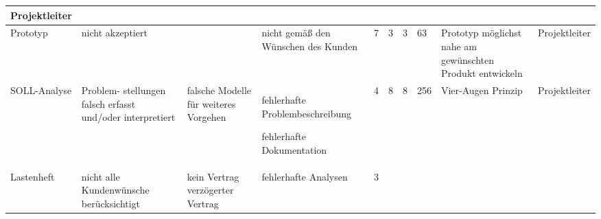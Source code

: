 \begin{center}
{\begin{tabular}{|p{1.5cm}|p{1.5cm}|p{1.7cm}|p{1.5cm}|p{0.25cm}|p{0.25cm}|p{0.25cm}|p{0.5cm}|p{1.5cm}|p{1.5cm}|}
{
	Projektleiter
}\\ \hline
%
%
{
	Prototyp
}&

{
	nicht akzeptiert
}&

{
	
}&

{
	nicht gem\"{a}\ss{} den W\"{u}nschen des Kunden
}&

{
	7
}&

{
	3
}&

{
	3
}&

{
	63
}&

{
	Prototyp m\"{o}glichst nahe am gew\"{u}nschten Produkt entwickeln
}&

{
	Projektleiter
}\\ \hline
%
%
{
	SOLL-Analyse
}&

{
	Problem- \newline stellungen falsch erfasst und/oder interpretiert
}&

{
	falsche Modelle f\"{u}r weiteres Vorgehen
}&

{
	fehlerhafte Problembeschreibung \par\medskip
	fehlerhafte Dokumentation
}&

{
	4
}&

{
	8
}&

{
	8
}&

{
	256
}&

{
	Vier-Augen Prinzip
}&

{
	Projektleiter
}\\ \hline
%
%
{
	Lastenheft
}&

{
	nicht alle Kundenw\"{u}nsche ber\"{u}cksichtigt
}&

{
	kein Vertrag \newline
	verz\"{o}gerter Vertrag
}&

{
	fehlerhafte Analysen
}&

{
	3
}&


\end{tabular}}
\end{center}
